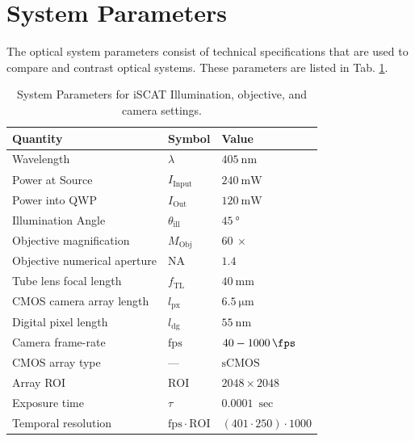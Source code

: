 \clearpage
\section{System Parameters}

The optical system parameters consist of technical specifications that are used to compare and contrast optical systems. These parameters are listed in Tab. \ref{tab:system_param}.

\begin{table}[h!]
    \centering
    \begin{tabularx}{0.65\textwidth}{@{}Xll@{}}
        \toprule
        \textbf{Quantity} & \textbf{Symbol} & \textbf{Value} \\
        \midrule
        Wavelength & $\lambda$ & $\SI{405}{\nm}$ \\
        Power at Source & $I_\mathrm{Input}$ & $\SI{240}{\milli\watt}$ \\
        Power into QWP & $I_\mathrm{Out}$ & $\SI{120}{\milli\watt}$ \\
        Illumination Angle & $\theta_\mathrm{ill}$ & $\SI{45}{\degree}$ \\
        Objective magnification & $M_\mathrm{Obj}$ & $\SI{60}{\times}$ \\
        Objective numerical aperture & $\mathrm{NA}$ & $1.4$ \\
        Tube lens focal length & $f_\mathrm{TL}$ & $\SI{40}{\mm}$ \\
        CMOS camera array length& $l_\mathrm{px}$ & $\SI{6.5}{\micro\meter}$ \\
        Digital pixel length& $l_\mathrm{dg}$ & $\SI{55}{\nano\meter}$ \\
        Camera frame-rate & $\mathrm{fps}$ & $40 - \SI{1000}{\fps}$ \\
        CMOS array type & --- & $\mathrm{sCMOS}$ \\
        Array ROI & $\mathrm{ROI}$ & $2048 \times 2048$ \\
        Exposure time & $\tau$ & $\SI{0.0001}{\sec}$ \\
        Temporal resolution & $\mathrm{fps}\cdot \mathrm{ROI}$ & $(401 \cdot 250) \cdot 1000$ \\

        \bottomrule        
    \end{tabularx}
    \caption{System Parameters for iSCAT Illumination, objective, and camera settings.}
    \label{tab:system_param}
\end{table}


